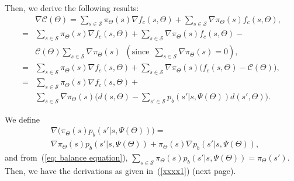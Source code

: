 \documentclass[twocolumn,10pt]{IEEEtran}
\begin{document}
Then, we derive the following results:
\begin{equation}
\begin{aligned}
& \nabla \mathcal{C} (\Theta)  = 	\sum_{s \in \mathcal{S}} \pi_{\Theta}({s}) \nabla f_c (s, \Theta) + \sum_{s \in \mathcal{S}} \nabla \pi_{\Theta}({s}) f_c (s, \Theta)	, \\
= &	\sum_{s \in \mathcal{S}} \pi_{\Theta}({s}) \nabla f_c (s, \Theta) + \sum_{s \in \mathcal{S}} \nabla \pi_{\Theta}({s}) f_c (s, \Theta)	- \\
& \mathcal{C} (\Theta) \sum_{s \in \mathcal{S}} \nabla \pi_{\Theta}({s})	\phantom{5} (\text{since} \phantom{5} \sum_{s \in \mathcal{S}} \nabla \pi_{\Theta}({s}) = 0),	\\
= &	\sum_{s \in \mathcal{S}} \pi_{\Theta}({s}) \nabla f_c (s, \Theta) + \sum_{s \in \mathcal{S}} \nabla \pi_{\Theta}({s})  \big( f_c (s, \Theta) - \mathcal{C} (\Theta) \big) ,	\nonumber	\\
= &	\sum_{s \in \mathcal{S}} \pi_{\Theta}({s}) \nabla f_c (s, \Theta) + \\
& \sum_{s \in \mathcal{S}} \nabla \pi_{\Theta}({s})   \bigg( d(s, \Theta) -  \sum_{s' \in \mathcal{S}} p_b (s'|s,\Psi(\Theta)) d(s', \Theta)  \bigg).
\end{aligned}
\end{equation}

We define
\begin{equation}
\begin{aligned}
\label{appendix:eq:derivation}
&\nabla \Big( \pi_{\Theta}({s})  p_b (s'|s,\Psi(\Theta)) \Big) = \\ 
&\nabla \pi_{\Theta}({s}) p_b (s'|s,\Psi(\Theta)) + \pi_{\Theta}({s}) \nabla p_b (s'|s,\Psi(\Theta))	,
\end{aligned}
\end{equation}
and from~(\ref{eq: balance equation}), $\sum_{s \in \mathcal{S}} \pi_{\Theta}({s}) p_b(s'|s,\Psi(\Theta)) = \pi_{\Theta}({s'})$. Then, we have the derivations as given in~(\ref{xxxx1}) (next page).
\end{document}
